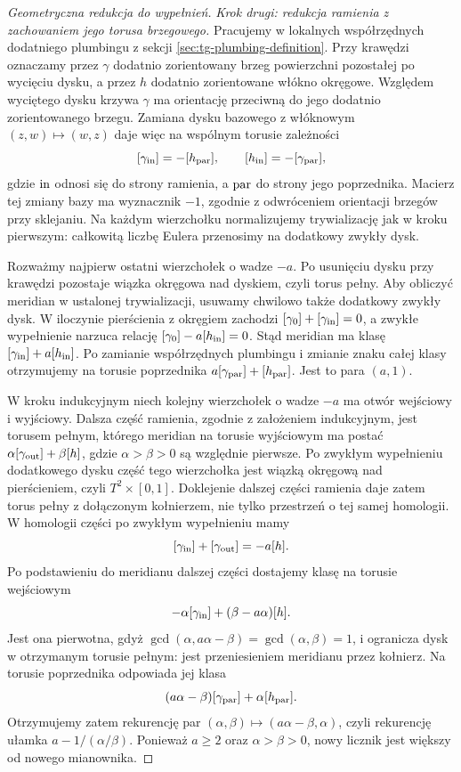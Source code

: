 \begin{proof}[Geometryczna redukcja do wypełnień]
\emph{Krok drugi: redukcja ramienia z zachowaniem
jego torusa brzegowego.}
Pracujemy w lokalnych współrzędnych dodatniego
plumbingu z sekcji \ref{sec:tg-plumbing-definition}.
Przy krawędzi oznaczamy przez $\gamma$ dodatnio
zorientowany brzeg powierzchni pozostałej po
wycięciu dysku, a przez $h$ dodatnio zorientowane
włókno okręgowe. Względem wyciętego dysku
krzywa $\gamma$ ma orientację przeciwną do jego
dodatnio zorientowanego brzegu. Zamiana dysku
bazowego z włóknowym $(z,w)\mapsto(w,z)$
daje więc na wspólnym torusie zależności
\[
[\gamma_{\rm in}]=-[h_{\rm par}],\qquad
[h_{\rm in}]=-[\gamma_{\rm par}],
\]
gdzie $\rm in$ odnosi się do strony ramienia,
a $\rm par$ do strony jego poprzednika.
Macierz tej zmiany bazy ma wyznacznik $-1$,
zgodnie z odwróceniem orientacji brzegów przy
sklejaniu. Na każdym wierzchołku normalizujemy
trywializację jak w kroku pierwszym: całkowitą
liczbę Eulera przenosimy na dodatkowy zwykły dysk.

Rozważmy najpierw ostatni wierzchołek o wadze $-a$.
Po usunięciu dysku przy krawędzi pozostaje
wiązka okręgowa nad dyskiem, czyli torus pełny.
Aby obliczyć meridian w ustalonej trywializacji,
usuwamy chwilowo także dodatkowy zwykły dysk.
W iloczynie pierścienia z okręgiem zachodzi
$[\gamma_0]+[\gamma_{\rm in}]=0$,
a zwykłe wypełnienie narzuca relację
$[\gamma_0]-a[h_{\rm in}]=0$.
Stąd meridian ma klasę
$[\gamma_{\rm in}]+a[h_{\rm in}]$.
Po zamianie współrzędnych plumbingu i zmianie
znaku całej klasy otrzymujemy na torusie poprzednika
$a[\gamma_{\rm par}]+[h_{\rm par}]$.
Jest to para $(a,1)$.

W kroku indukcyjnym niech kolejny wierzchołek
o wadze $-a$ ma otwór wejściowy i wyjściowy.
Dalsza część ramienia, zgodnie z założeniem
indukcyjnym, jest torusem pełnym, którego meridian
na torusie wyjściowym ma postać
$\alpha[\gamma_{\rm out}]+\beta[h]$,
gdzie $\alpha>\beta>0$ są względnie pierwsze.
Po zwykłym wypełnieniu dodatkowego dysku
część tego wierzchołka jest wiązką okręgową
nad pierścieniem, czyli $T^2\times[0,1]$.
Doklejenie dalszej części ramienia daje zatem
torus pełny z dołączonym kołnierzem, nie tylko
przestrzeń o tej samej homologii.
W homologii części po zwykłym wypełnieniu mamy
\[
[\gamma_{\rm in}]+[\gamma_{\rm out}]=-a[h].
\]
Po podstawieniu do meridianu dalszej części
dostajemy klasę na torusie wejściowym
\[
-\alpha[\gamma_{\rm in}]+(\beta-a\alpha)[h].
\]
Jest ona pierwotna, gdyż
$\gcd(\alpha,a\alpha-\beta)=\gcd(\alpha,\beta)=1$,
i ogranicza dysk w otrzymanym torusie pełnym:
jest przeniesieniem meridianu przez kołnierz.
Na torusie poprzednika odpowiada jej klasa
\[
(a\alpha-\beta)[\gamma_{\rm par}]
+\alpha[h_{\rm par}].
\]
Otrzymujemy zatem rekurencję par
$(\alpha,\beta)\mapsto(a\alpha-\beta,\alpha)$,
czyli rekurencję ułamka $a-1/(\alpha/\beta)$.
Ponieważ $a\ge2$ oraz $\alpha>\beta>0$,
nowy licznik jest większy od nowego mianownika.


\end{proof}
